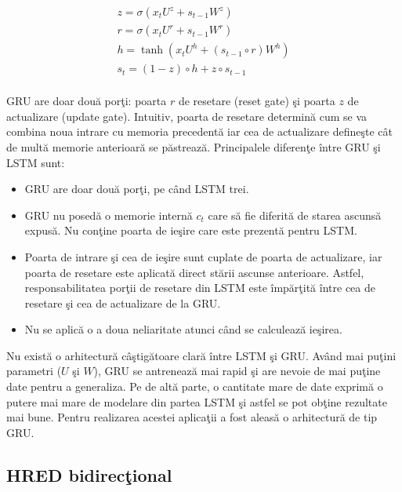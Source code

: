 \begin{equation}
\begin{split}
z = \sigma(x_{t}U^{z} + s_{t-1}W^{z})\\
r = \sigma(x_{t}U^{r} + s_{t-1}W^{r})\\
h = \tanh(x_{t}U^{h} + (s_{t-1} \circ r)W^{h})\\
s_{t} = (1 - z) \circ h + z \circ s_{t-1}\\
\end{split}
\end{equation}

GRU are doar dou\u a por\c ti: poarta \(r\) de resetare (reset gate) \c si poarta \(z\) de actualizare (update gate). Intuitiv, poarta de resetare determin\u a cum se va combina noua intrare cu memoria precedent\u a iar cea de actualizare define\c ste c\^ at de mult\u a memorie anterioar\u a se p\u astreaz\u a. Principalele diferen\c te \^ intre GRU \c si LSTM sunt:
\begin{itemize}
  \item GRU are doar dou\u a por\c ti, pe c\^ and LSTM trei.
  \item GRU nu posed\u a o memorie intern\u a \(c_{t}\) care s\u a fie diferit\u a de starea ascuns\u a expus\u a. Nu con\c tine poarta de ie\c sire care este prezent\u a pentru LSTM.
  \item Poarta de intrare \c si cea de ie\c sire sunt cuplate de poarta de actualizare, iar poarta de resetare este aplicat\u a direct st\u arii ascunse anterioare. Astfel, responsabilitatea por\c tii de resetare din LSTM este \^ imp\u ar\c tit\u a \^ intre cea de resetare \c si cea de actualizare de la GRU.
  \item Nu se aplic\u a o a doua neliaritate atunci c\^ and se calculeaz\u a ie\c sirea.
\end{itemize}

Nu exist\u a o arhitectur\u a c\^ a\c stig\u atoare clar\u a \^ intre LSTM \c si GRU. Av\^ and mai pu\c tini parametri (\(U\) \c si \(W\)), GRU se antreneaz\u a mai rapid \c si are nevoie de mai pu\c tine date pentru a generaliza. Pe de alt\u a parte, o cantitate mare de date	exprim\u a o putere mai mare de modelare din partea LSTM \c si astfel se pot ob\c tine rezultate mai bune. Pentru realizarea acestei aplica\c tii a fost aleas\u a o arhitectur\u a de tip GRU.

\subsection{HRED bidirec\c tional}


